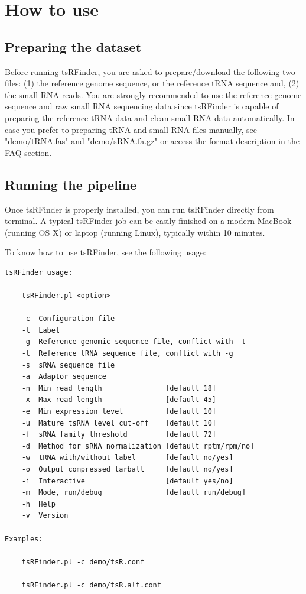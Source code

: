 \documentclass[11pt, a4paper]{article}
\begin{document}
\section{How to use}

\subsection{Preparing the dataset}

Before running tsRFinder, you are asked to prepare/download the following two files: (1) the reference genome sequence, or the reference tRNA sequence and, (2) the small RNA reads. You are strongly recommended to use the reference genome sequence and raw small RNA sequencing data since tsRFinder is capable of preparing the reference tRNA data and clean small RNA data automatically. In case you prefer to preparing tRNA and small RNA files manually, see "demo/tRNA.fas" and "demo/sRNA.fa.gz" or access the format description in the FAQ section.

\subsection{Running the pipeline}

Once tsRFinder is properly installed, you can run tsRFinder directly from terminal. A typical tsRFinder job can be easily finished on a modern MacBook (running OS X) or laptop (running Linux), typically within 10 minutes.

To know how to use tsRFinder, see the following usage:

{\scriptsize \begin{tcolorbox}[colback=blue!5!white,colframe=pink!75!black,title=Usage of tsRFinder: ./tsRFinder.pl -h]
\begin{verbatim}
tsRFinder usage:

    tsRFinder.pl <option>

    -c  Configuration file
    -l  Label
    -g  Reference genomic sequence file, conflict with -t
    -t  Reference tRNA sequence file, conflict with -g
    -s  sRNA sequence file
    -a  Adaptor sequence
    -n  Min read length               [default 18]
    -x  Max read length               [default 45]
    -e  Min expression level          [default 10]
    -u  Mature tsRNA level cut-off    [default 10]
    -f  sRNA family threshold         [default 72]
    -d  Method for sRNA normalization [default rptm/rpm/no]
    -w  tRNA with/without label       [default no/yes]
    -o  Output compressed tarball     [default no/yes]
    -i  Interactive                   [default yes/no]
    -m  Mode, run/debug               [default run/debug]
    -h  Help
    -v  Version

Examples:

    tsRFinder.pl -c demo/tsR.conf

    tsRFinder.pl -c demo/tsR.alt.conf
\end{verbatim}
\end{tcolorbox}}
\end{document}
